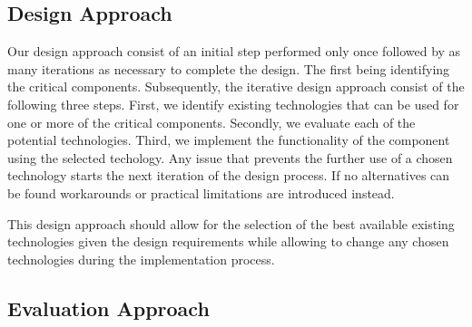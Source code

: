 \subsection{Design Approach}

Our design approach consist of an initial step performed only once followed by
as many iterations as necessary to complete the design. The first being
identifying the critical components. Subsequently, the iterative design approach
consist of the following three steps. First, we identify existing technologies
that can be used for one or more of the critical components. Secondly, we
evaluate each of the potential technologies. Third, we implement the
functionality of the component using the selected techology. Any issue that
prevents the further use of a chosen technology starts the next iteration of the
design process. If no alternatives can be found workarounds or practical
limitations are introduced instead.

This design approach should allow for the selection of the best available
existing technologies given the design requirements while allowing to change
any chosen technologies during the implementation process.

\subsection{Evaluation Approach}

